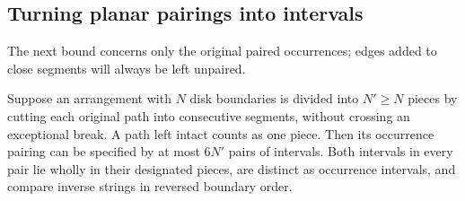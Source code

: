 \subsection{Turning planar pairings into intervals}

The next bound concerns only the original paired occurrences; edges
added to close segments will always be left unpaired.

\begin{lemma}
\label{lem:planar-intervals}
Suppose an arrangement with $N$ disk boundaries is divided into $N'\ge N$
pieces by cutting each original path into consecutive segments, without
crossing an exceptional break.  A path left intact counts as one piece.
Then its occurrence pairing can be specified by at most $6N'$ pairs of
intervals.  Both intervals in every pair lie wholly in their designated
pieces, are distinct as occurrence intervals, and compare inverse
strings in reversed boundary order.
\end{lemma}

